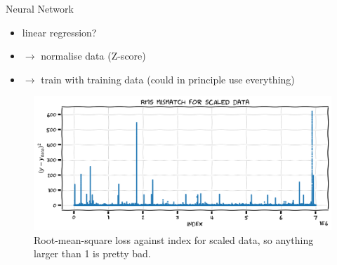 \documentclass[xcolor=x11names,compress]{beamer}
\renewcommand{\(}{\begin{columns}}
\renewcommand{\)}{\end{columns}}
\newcommand{\<}[1]{\begin{column}{#1}}
\renewcommand{\>}{\end{column}}
\begin{document}

\begin{frame}{Neural Network}

\begin{itemize}
  \item linear regression?
  \item[] $\to$ normalise data {\tiny (Z-score)}
  \item[] $\to$ train with training data {\tiny (could in principle use everything)}
\end{itemize}

\begin{figure}
  \includegraphics[width=\textwidth]{argo_data_train_linreg_RMS}
  \caption{Root-mean-square loss against index for scaled data, so anything
  larger than 1 is pretty bad.}
\end{figure}

\end{frame}

\end{document}
